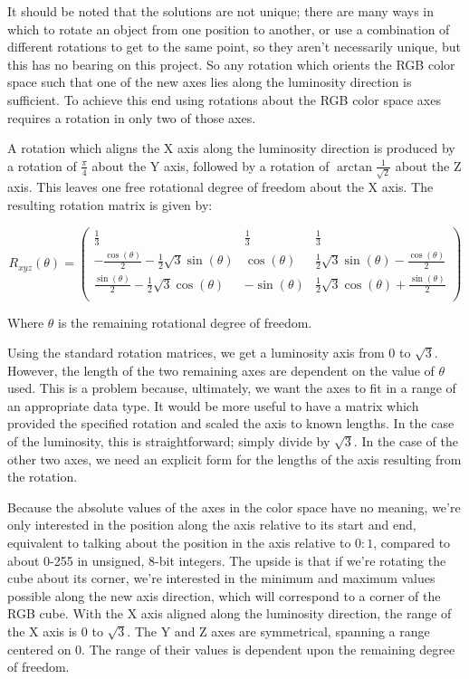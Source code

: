 It should be noted that the solutions are not unique; there are many ways in which to rotate an object from one position to another, or use a combination of different rotations to get to the same point, so they aren't necessarily unique, but this has no bearing on this project. So any rotation which orients the RGB color space such that one of the new axes lies along the luminosity direction is sufficient. To achieve this end using rotations about the RGB color space axes requires a rotation in only two of those axes.

A rotation which aligns the X axis along the luminosity direction is produced by a rotation of $\frac{\pi}4$ about the Y axis, followed by a rotation of $\arctan{\frac{1}{\sqrt{2}}}$ about the Z axis. This leaves one free rotational degree of freedom about the X axis. The resulting rotation matrix is given by:

\begin{equation}
R_{xyz}(\theta) =
\left(
\begin{array}{ccc}
 \frac{1}{3} & \frac{1}{3} & \frac{1}{3} \\
 -\frac{\cos (\theta )}{2}-\frac{1}{2} \sqrt{3} \sin (\theta ) & \cos (\theta ) & \frac{1}{2} \sqrt{3} \sin (\theta )-\frac{\cos (\theta )}{2} \\
 \frac{\sin (\theta )}{2}-\frac{1}{2} \sqrt{3} \cos (\theta ) & -\sin (\theta ) & \frac{1}{2} \sqrt{3} \cos (\theta )+\frac{\sin (\theta )}{2} \\
\end{array}
\right)
\end{equation}


Where $\theta$ is the remaining rotational degree of freedom.

Using the standard rotation matrices, we get a luminosity axis from 0 to $\sqrt{3}$. However, the length of the two remaining axes are dependent on the value of $\theta$ used. This is a problem because, ultimately, we want the axes to fit in a range of an appropriate data type. It would be more useful to have a matrix which provided the specified rotation and scaled the axis to known lengths. In the case of the luminosity, this is straightforward; simply divide by $\sqrt{3}$. In the case of the other two axes, we need an explicit form for the lengths of the axis resulting from the rotation.

Because the absolute values of the axes in the color space have no meaning, we're only interested in the position along the axis relative to its start and end, equivalent to talking about the position in the axis relative to $0:1$, compared to about 0-255 in unsigned, 8-bit integers. The upside is that if we're rotating the cube about its corner, we're interested in the minimum and maximum values possible along the new axis direction, which will correspond to a corner of the RGB cube. With the X axis aligned along the luminosity direction, the range of the X axis is 0 to $\sqrt{3}$. The Y and Z axes are symmetrical, spanning a range centered on 0. The range of their values is dependent upon the remaining degree of freedom.

